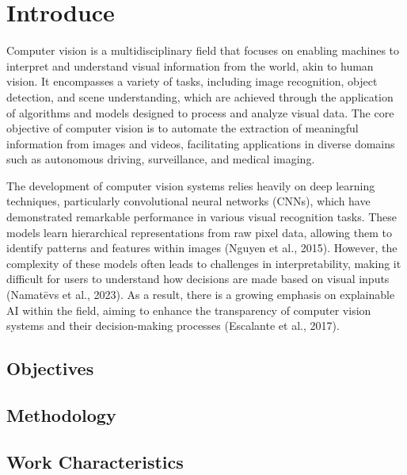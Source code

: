 \documentclass{article}
\begin{document}
\title{}
\author{Marcin Ryzewski}
\date{\today}
\maketitle  

\section{Introduce}

Computer vision is a multidisciplinary field that focuses 
on enabling machines to interpret and understand visual 
information from the world, akin to human vision. 
It encompasses a variety of tasks, including image 
recognition, object detection, and scene understanding, 
which are achieved through the application of algorithms and 
models designed to process and analyze visual data. 
The core objective of computer vision is to automate the 
extraction of meaningful information from images and videos, 
facilitating applications in diverse domains such as 
autonomous driving, surveillance, and medical imaging.

The development of computer vision systems relies heavily 
on deep learning techniques, particularly convolutional 
neural networks (CNNs), which have demonstrated remarkable 
performance in various visual recognition tasks. These 
models learn hierarchical representations from raw pixel 
data, allowing them to identify patterns and features 
within images (Nguyen et al., 2015). However, the complexity 
of these models often leads to challenges in interpretability, 
making it difficult for users to understand how decisions 
are made based on visual inputs (Namatēvs et al., 2023). 
As a result, there is a growing emphasis on explainable 
AI within the field, aiming to enhance the transparency 
of computer vision systems and their decision-making 
processes (Escalante et al., 2017).

\subsection{Objectives}

\subsection{Methodology}

\subsection{Work Characteristics}
\end{document}
